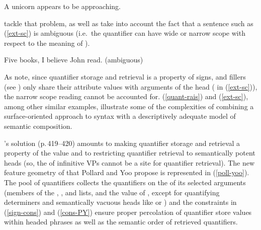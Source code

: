 \documentclass[output=paper,biblatex,babelshorthands,newtxmath,draftmode,colorlinks,citecolor=brown]{langscibook}
\begin{document}
\begin{exe}
\ex\label{quant-rais}A unicorn appears to be approaching.
\end{exe}

\noindent
\citet{PollardandYoo1998} tackle that problem, as well as take into account the fact that a sentence such as (\ref{ext-sc}) is ambiguous (i.e.\ the quantifier  can have wide or narrow scope with respect to the meaning of ). 
\begin{exe}
\ex\label{ext-sc}
Five books, I believe John read. (ambiguous)
\end{exe}

As \citeauthor{PollardandYoo1998} note, since quantifier storage and retrieval is a property of signs, and fillers (see ) only share their  attribute values with arguments of the head ( in (\ref{ext-sc})), the narrow scope reading cannot be accounted for. (\ref{quant-rais}) and (\ref{ext-sc}), among other similar examples, illustrate some of the complexities of combining a surface-oriented approach to syntax with a descriptively adequate model of semantic composition.



\citeauthor{PollardandYoo1998}'s solution (p.\,419--420) amounts to making quantifier storage and retrieval a property of the  value  and to restricting quantifier retrieval to semantically potent heads (so, the  of infinitive VPs cannot be a site for quantifier retrieval). The new feature geometry of  that Pollard and Yoo propose is represented in (\ref{poll-yoo}). The pool of quantifiers collects the quantifiers on the  of its selected arguments (members of the , , and  lists, and the value of , except for quantifying determiners and semantically vacuous heads like  or ) and the constraints in (\ref{sign-cons}) and (\ref{cons-PY}) \citep[423]{PollardandYoo1998} ensure proper percolation of quantifier store values within headed phrases as well as the semantic order of retrieved quantifiers.

\begin{exe}
\ex\label{poll-yoo}

\end{exe}
\end{document}
